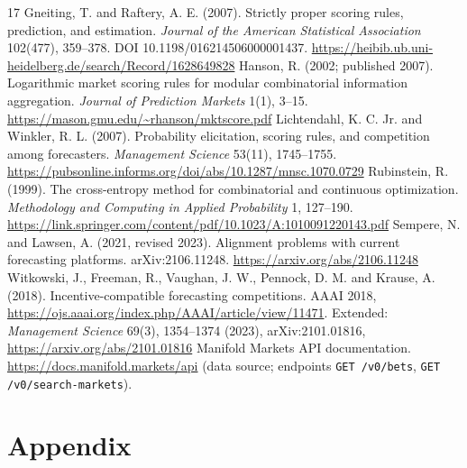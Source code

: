\documentclass[10pt]{article}
\begin{document}
\begin{thebibliography}{17}
 Gneiting, T. and Raftery, A. E. (2007). Strictly proper scoring rules, prediction, and estimation. \emph{Journal of the American Statistical Association} 102(477), 359--378. DOI 10.1198/016214506000001437. \url{https://heibib.ub.uni-heidelberg.de/search/Record/1628649828}
 Hanson, R. (2002; published 2007). Logarithmic market scoring rules for modular combinatorial information aggregation. \emph{Journal of Prediction Markets} 1(1), 3--15. \url{https://mason.gmu.edu/~rhanson/mktscore.pdf}
 Lichtendahl, K. C. Jr. and Winkler, R. L. (2007). Probability elicitation, scoring rules, and competition among forecasters. \emph{Management Science} 53(11), 1745--1755. \url{https://pubsonline.informs.org/doi/abs/10.1287/mnsc.1070.0729}
 Rubinstein, R. (1999). The cross-entropy method for combinatorial and continuous optimization. \emph{Methodology and Computing in Applied Probability} 1, 127--190. \url{https://link.springer.com/content/pdf/10.1023/A:1010091220143.pdf}
 Sempere, N. and Lawsen, A. (2021, revised 2023). Alignment problems with current forecasting platforms. arXiv:2106.11248. \url{https://arxiv.org/abs/2106.11248}
 Witkowski, J., Freeman, R., Vaughan, J. W., Pennock, D. M. and Krause, A. (2018). Incentive-compatible forecasting competitions. AAAI 2018, \url{https://ojs.aaai.org/index.php/AAAI/article/view/11471}. Extended: \emph{Management Science} 69(3), 1354--1374 (2023), arXiv:2101.01816, \url{https://arxiv.org/abs/2101.01816}
 Manifold Markets API documentation. \url{https://docs.manifold.markets/api} (data source; endpoints \texttt{GET /v0/bets}, \texttt{GET /v0/search-markets}).
\end{thebibliography}

\appendix
\renewcommand{\thetable}{A\arabic{table}}
\renewcommand{\thefigure}{A\arabic{figure}}
\setcounter{table}{0}
\section*{Appendix}
\label{app:start}
\end{document}
